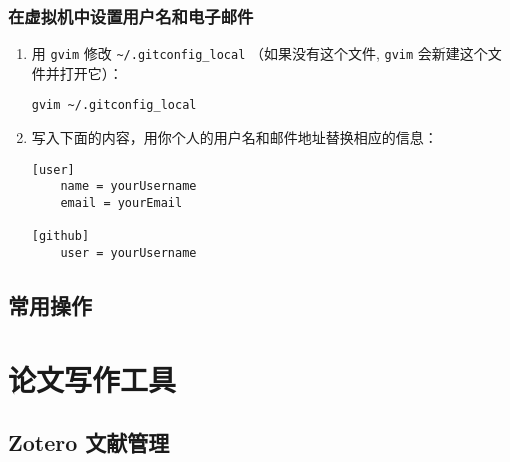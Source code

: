 \documentclass[cn,11pt, simple]{elegantbook}
\begin{document}
\newpage
\subsection{在虚拟机中设置用户名和电子邮件}%
\label{sub:git-user-info}

\begin{enumerate}
    \item 用 \lstinline{gvim} 修改 \lstinline{~/.gitconfig_local}
        （如果没有这个文件, \lstinline{gvim} 会新建这个文件并打开它）：
\begin{lstlisting}[escapeinside=``]
gvim ~/.gitconfig_local
\end{lstlisting}
    \item 写入下面的内容，用你个人的用户名和邮件地址替换相应的信息：
\begin{lstlisting}[escapeinside=``]
[user]
	name = yourUsername
	email = yourEmail

[github]
	user = yourUsername
\end{lstlisting}
\end{enumerate}

%
%
%
%
\section{常用操作}%
\label{sec:git-tips}
%

\chapter{论文写作工具}%
\label{cha:tools-writing}

\section{Zotero 文献管理}%
\label{sec:citation-zotero}


%

\end{document}
